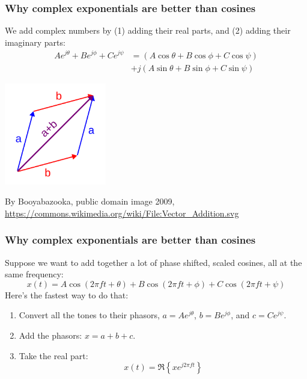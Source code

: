 \documentclass{beamer}
\begin{document}
\begin{frame}
  \frametitle{Why complex exponentials are better than cosines}

  We add complex numbers by (1) adding their real parts, and (2)
  adding their imaginary parts:
  \begin{align*}
    Ae^{j\theta}+Be^{j\phi}+Ce^{j\psi} &= (A\cos\theta+B\cos\phi+C\cos\psi)\\
    &+j(A\sin\theta+B\sin\phi+C\sin\psi)
  \end{align*}
  \centerline{\includegraphics[height=1.75in]{Vector_Addition.png}}
  \begin{tiny}
    By Booyabazooka, public domain image 2009,
    \url{https://commons.wikimedia.org/wiki/File:Vector_Addition.svg}
  \end{tiny}
\end{frame}


\begin{frame}
  \frametitle{Why complex exponentials are better than cosines}

  Suppose we want to add together a lot of phase shifted, scaled
  cosines, all at the same frequency:
  \[
  x(t) = A\cos\left(2\pi ft+\theta\right)+B\cos\left(2\pi ft+\phi\right)+C\cos\left(2\pi ft+\psi\right)
  \]
  Here's the fastest way to do that:
  \begin{enumerate}
  \item Convert all the tones to their phasors, $a=Ae^{j\theta}$,
    $b=Be^{j\phi}$, and $c=Ce^{j\psi}$.
  \item Add the phasors: $x=a+b+c$.
  \item Take the real part:
    \[x(t) = \Re\left\{xe^{j2\pi ft}\right\}
    \]
  \end{enumerate}
\end{frame}
\end{document}
